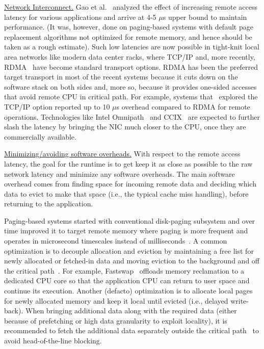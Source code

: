 \vspace{3pt}
\noindent \uline{Network Interconnect.}
Gao et al.~\cite{netdisagg} analyzed the effect of increasing
remote access latency for various applications and arrive at 
4-5 $\mu$s upper bound to maintain performance. (It was, 
however, done on paging-based systems with default page 
replacement algorithms not optimized for remote memory, and 
hence should be taken as a rough estimate).
Such low latencies are now possible in tight-knit
local area networks like modern data center racks,  
where TCP/IP and, more recently, RDMA~\cite{rocev2} have
become standard transport options. 
RDMA has been the preferred target transport 
in most of the recent systems because it cuts down on the 
software stack on both sides and, more so, because it 
provides one-sided accesses that avoid remote CPU in 
critical path. For example, systems that~\cite{literdma,aifm}
explored the TCP/IP option reported up to 10 $\mu$s overhead 
compared to RDMA for remote operations. Technologies 
like Intel Omnipath~\cite{omnipath} and CCIX~\cite{ccix}
are expected to further slash the latency by bringing the NIC 
much closer to the CPU, once they are commercially available. 




\vspace{3pt}
\noindent \uline{Minimizing/avoiding software overheads.}
With respect to the remote access latency, the goal for the 
runtime is to get keep it as close as possible to the raw network 
latency and minimize any software overheads. The main software 
overhead comes from finding space for incoming remote data 
and deciding which data to evict to make that space 
(i.e., the typical cache miss handling), before returning to 
the application. 

Paging-based systems started with conventional disk-paging 
subsystem and over time improved it to target remote memory
where paging is more frequent and operates in microsecond
timescales instead of milliseconds~\cite{Lim2012}. A common 
optimization is to decouple allocation and eviction by 
maintaining a free list for newly allocated or fetched-in 
data and moving eviction to the background and off the 
critical path~\cite{Lim2012,leap}. 
For example, Fastswap~\cite{fastswap} offloads  
memory reclamation to a dedicated CPU core so that the 
application CPU can return to user space and continue its 
execution. Another (defacto) optimization is to allocate local 
pages for newly allocated memory and keep it local until evicted
(i.e., delayed write-back).
When bringing additional data along with the required data
(either because of prefetching or high data granularity to 
exploit locality), it is recommended to fetch the additional 
data separately outside the critical path~\cite{fastswap} to 
avoid head-of-the-line blocking.

